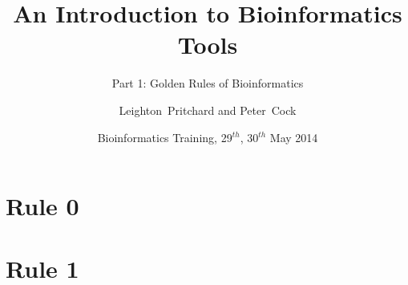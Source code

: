 
%



\title[Intro to Bioinformatics] %
{An Introduction to Bioinformatics Tools}
\subtitle{Part 1: Golden Rules of Bioinformatics}
\author[Pritchard, Cock] %
{Leighton~Pritchard and Peter~Cock}
\date[May 2014] %
{Bioinformatics Training, 29$^{th}$, 30$^{th}$ May 2014}
\subject{Bioinformatics}





\frame[plain]{\titlepage}
  
%
   
    
\section{Rule 0}
  

\section{Rule 1}
%
